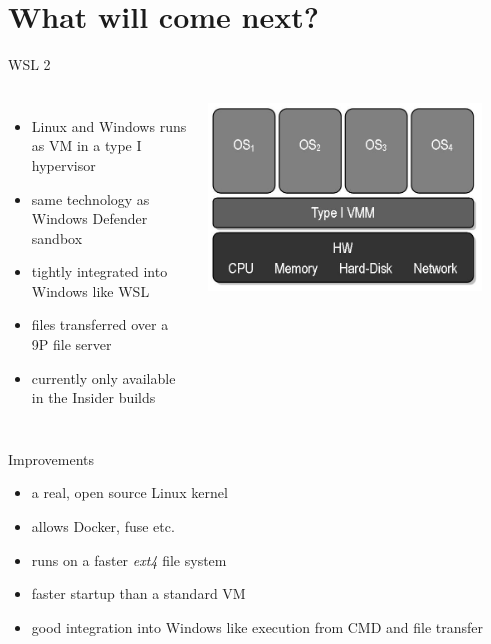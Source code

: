 \documentclass[10pt,graphics,aspectratio=169,table]{beamer}
\begin{document}
\section{What will come next?}
\begin{frame}{WSL 2}
\begin{columns}
        \begin{itemize}
            \item Linux and Windows runs as VM in a type I hypervisor
            \item same technology as Windows Defender sandbox
            \item tightly integrated into Windows like WSL
            \item files transferred over a 9P file server
            \item currently only available in the Insider builds
        \end{itemize}
        \hfill \cite{wsl2}
        \includegraphics[width=0.9\textwidth]{img/type1.jpg} \cite{type1}
\end{columns}
\end{frame}

\begin{frame}{Improvements}
\begin{itemize}
    \item a real, open source Linux kernel
    \item allows Docker, fuse etc.
    \item runs on a faster \textit{ext4} file system
    \item faster startup than a standard VM
    \item good integration into Windows like execution from CMD and file transfer
\end{itemize}
\hfill\cite{wsl2}
\end{frame}
\end{document}
